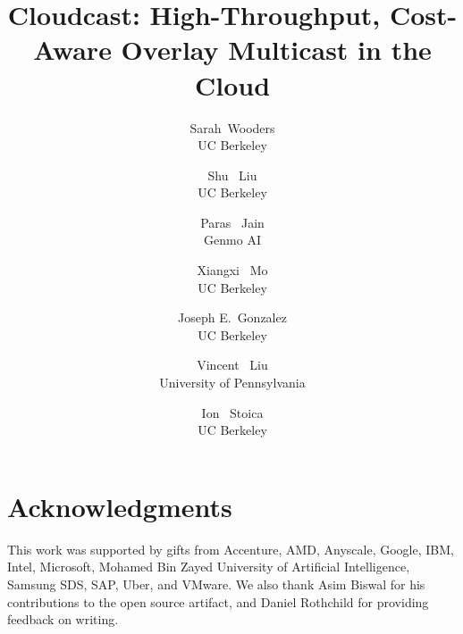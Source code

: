 \documentclass[letterpaper,twocolumn,10pt]{article}
\newcommand{\sys}{Cloudcast\xspace}
\begin{document}
\title{\sys: High-Throughput, Cost-Aware Overlay Multicast in the Cloud}




\date{}

\author{
{\rm Sarah\ Wooders}\\
UC Berkeley
\and
{\rm Shu \ Liu}\\
UC Berkeley
\and
{\rm Paras \ Jain}\\
Genmo AI 
\and
{\rm Xiangxi \ Mo}\\
UC Berkeley
\and 
{\rm Joseph E.\ Gonzalez }\\
UC Berkeley
\and
{\rm Vincent \ Liu}\\
University of Pennsylvania
\and
{\rm Ion \ Stoica}\\
UC Berkeley
} %

\maketitle





%

%






\section*{Acknowledgments}
This work was supported by gifts from Accenture, AMD, Anyscale, Google, IBM, Intel, Microsoft, Mohamed Bin Zayed University of Artificial Intelligence, Samsung SDS, SAP, Uber, and VMware. We also thank Asim Biswal for his contributions to the open source artifact, and Daniel Rothchild for providing feedback on writing. 




\appendix
%

\end{document}
